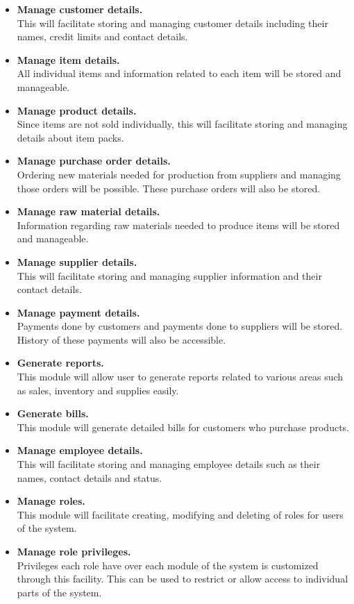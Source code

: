 \documentclass[12pt]{report}
\begin{document}
\begin{itemize}
	\item {\bf{Manage customer details.}}\\
	      This will facilitate storing and managing customer details including their names, credit limits and contact details.

	\item {\bf{Manage item details.}}\\
	      All individual items and information related to each item will be stored and manageable.

	\item {\bf{Manage product details.}}\\
	      Since items are not sold individually, this will facilitate storing and managing details about item packs.

	\item {\bf{Manage purchase order details.}}\\
	      Ordering new materials needed for production from suppliers and managing those orders will be possible. These purchase orders
	      will also be stored.

	\item {\bf{Manage raw material details.}}\\
	      Information regarding raw materials needed to produce items will be stored and manageable.

	\item {\bf{Manage supplier details.}}\\
	      This will facilitate storing and managing supplier information and their contact details.

	\item {\bf{Manage payment details.}}\\
	      Payments done by customers and payments done to suppliers will be stored. History of these payments will also be accessible.
	\item {\bf{Generate reports.}}\\
	      This module will allow user to generate reports related to various areas such as sales, inventory and supplies easily.

	\item {\bf{Generate bills.}}\\
	      This module will generate detailed bills for customers who purchase products.

	\item {\bf{Manage employee details.}}\\
	      This will facilitate storing and managing employee details such as their names, contact details and status.

	\item {\bf{Manage roles.}}\\
	      This module will facilitate creating, modifying and deleting of roles for users of the system.

	\item {\bf{Manage role privileges.}}\\
	      Privileges each role have over each module of the system is customized through this facility. This can be used to restrict or allow access to individual parts of the system.
\end{itemize}
\end{document}

